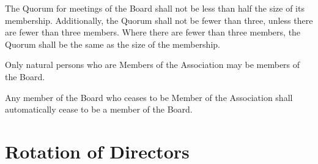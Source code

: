 \documentclass[10pt]{mk-articles-of-association}
\newcommand{\EC}[0]{Board}
\newcommand{\Exec}[0]{\EC{} }
\begin{document}
\begin{constenum}
  \item The Quorum for meetings of the \Exec shall not be less than
    half the size of its membership. Additionally, the Quorum shall
    not be fewer than three, unless there are fewer than three
    members. Where there are fewer than three members, the Quorum shall
    be the same as the size of the membership.

  \item Only natural persons who are Members of the Association
    may be members of the \EC{}.

  \item Any member of the \Exec who ceases to be Member of the Association
    shall automatically cease to be a member of the \EC{}.

  \end{constenum}


\section{Rotation of Directors}
\end{document}
